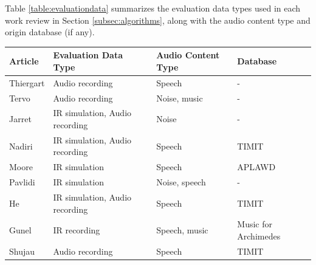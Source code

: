 Table \ref{table:evaluationdata} summarizes the evaluation data types used in each work review in Section \ref{subsec:algorithms}, along with the audio content type and origin database (if any).    


\begin{table}[htpb]
    \centering
    \footnotesize

	\begin{tabular}{ p{2cm} p{2.8cm} p{2.5cm} p{2.3cm} }
    \toprule
    
    \textbf{Article} &
    \textbf{Evaluation Data Type} &
    \textbf{Audio Content Type} &
    \textbf{Database}\\
    \midrule
    
    Thiergart \cite{Thiergart2009}
    & Audio recording 
    & Speech
    & -\\
    
    Tervo \cite{Tervo2009}
    & Audio recording
    & Noise, music
    & -\\
    
    Jarret \cite{Jarrett2010} 
    & IR simulation, Audio recording
    & Noise
    & -\\
    
    Nadiri \cite{Nadiri2014}   
    & IR simulation, Audio recording
    & Speech
    & TIMIT \\
    
    Moore \cite{Moore2015}   
    & IR simulation 
    & Speech
    & APLAWD \\
    
    Pavlidi \cite{Pavlidi2015}
    & IR simulation 
    & Noise, speech
    & -\\
    
    He \cite{He2017}   
    & IR simulation, Audio recording
    & Speech
    & TIMIT \\

    
    
    \midrule
    
    Gunel \cite{Gunel2008}
    & IR recording
    & Speech, music
    & Music for Archimedes \\
    
    Shujau \cite{Shujau2011} 
    & Audio recording
    & Speech
    & TIMIT \\
    

\end{tabular}
\end{table}
